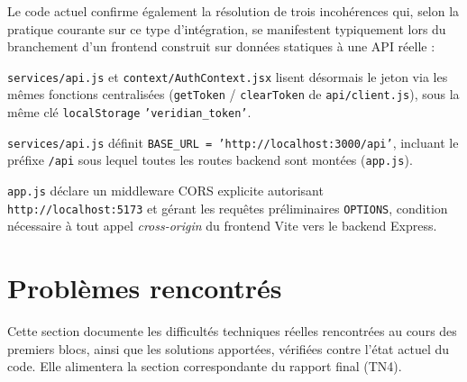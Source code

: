 \documentclass[12pt, a4paper]{article}
\begin{document}
Le code actuel confirme également la résolution de trois incohérences qui, selon la pratique courante sur ce type d'intégration, se manifestent typiquement lors du branchement d'un frontend construit sur données statiques à une API réelle :

\begin{okbox}
  \texttt{services/api.js} et \texttt{context/AuthContext.jsx} lisent désormais le jeton via les mêmes fonctions centralisées (\texttt{getToken} / \texttt{clearToken} de \texttt{api/client.js}), sous la même clé \texttt{localStorage} \texttt{'veridian\_token'}.
\end{okbox}

\begin{okbox}
  \texttt{services/api.js} définit \texttt{BASE\_URL = 'http://localhost:3000/api'}, incluant le préfixe \texttt{/api} sous lequel toutes les routes backend sont montées (\texttt{app.js}).
\end{okbox}

\begin{okbox}
  \texttt{app.js} déclare un middleware CORS explicite autorisant \texttt{http://localhost:5173} et gérant les requêtes préliminaires \texttt{OPTIONS}, condition nécessaire à tout appel \textit{cross-origin} du frontend Vite vers le backend Express.
\end{okbox}

\section{Problèmes rencontrés}
\label{sec:problemes}

Cette section documente les difficultés techniques réelles rencontrées au cours des premiers blocs, ainsi que les solutions apportées, vérifiées contre l'état actuel du code. Elle alimentera la section correspondante du rapport final (TN4).
\end{document}
